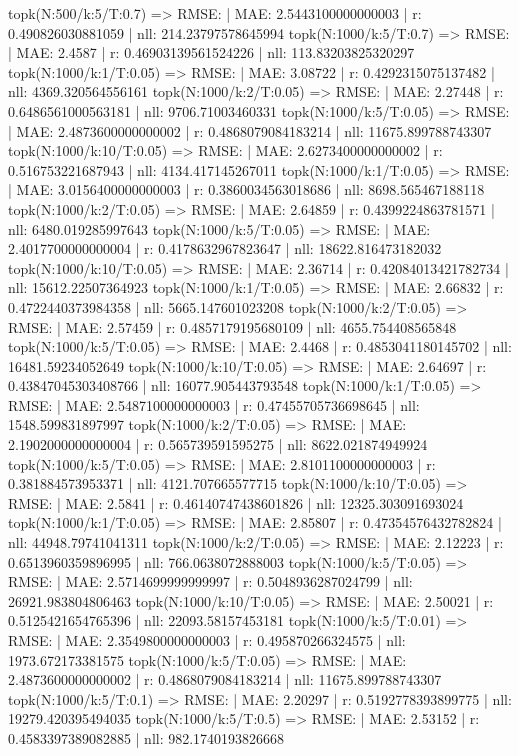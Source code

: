 topk(N:500/k:5/T:0.7) => RMSE: | MAE: 2.5443100000000003 | r: 0.490826030881059 | nll: 214.23797578645994
topk(N:1000/k:5/T:0.7) => RMSE: | MAE: 2.4587 | r: 0.46903139561524226 | nll: 113.83203825320297
topk(N:1000/k:1/T:0.05) => RMSE: | MAE: 3.08722 | r: 0.4292315075137482 | nll: 4369.320564556161
topk(N:1000/k:2/T:0.05) => RMSE: | MAE: 2.27448 | r: 0.6486561000563181 | nll: 9706.71003460331
topk(N:1000/k:5/T:0.05) => RMSE: | MAE: 2.4873600000000002 | r: 0.4868079084183214 | nll: 11675.899788743307
topk(N:1000/k:10/T:0.05) => RMSE: | MAE: 2.6273400000000002 | r: 0.516753221687943 | nll: 4134.417145267011
topk(N:1000/k:1/T:0.05) => RMSE: | MAE: 3.0156400000000003 | r: 0.3860034563018686 | nll: 8698.565467188118
topk(N:1000/k:2/T:0.05) => RMSE: | MAE: 2.64859 | r: 0.4399224863781571 | nll: 6480.019285997643
topk(N:1000/k:5/T:0.05) => RMSE: | MAE: 2.4017700000000004 | r: 0.4178632967823647 | nll: 18622.816473182032
topk(N:1000/k:10/T:0.05) => RMSE: | MAE: 2.36714 | r: 0.42084013421782734 | nll: 15612.22507364923
topk(N:1000/k:1/T:0.05) => RMSE: | MAE: 2.66832 | r: 0.4722440373984358 | nll: 5665.147601023208
topk(N:1000/k:2/T:0.05) => RMSE: | MAE: 2.57459 | r: 0.4857179195680109 | nll: 4655.754408565848
topk(N:1000/k:5/T:0.05) => RMSE: | MAE: 2.4468 | r: 0.4853041180145702 | nll: 16481.59234052649
topk(N:1000/k:10/T:0.05) => RMSE: | MAE: 2.64697 | r: 0.43847045303408766 | nll: 16077.905443793548
topk(N:1000/k:1/T:0.05) => RMSE: | MAE: 2.5487100000000003 | r: 0.47455705736698645 | nll: 1548.599831897997
topk(N:1000/k:2/T:0.05) => RMSE: | MAE: 2.1902000000000004 | r: 0.565739591595275 | nll: 8622.021874949924
topk(N:1000/k:5/T:0.05) => RMSE: | MAE: 2.8101100000000003 | r: 0.381884573953371 | nll: 4121.707665577715
topk(N:1000/k:10/T:0.05) => RMSE: | MAE: 2.5841 | r: 0.46140747438601826 | nll: 12325.303091693024
topk(N:1000/k:1/T:0.05) => RMSE: | MAE: 2.85807 | r: 0.47354576432782824 | nll: 44948.79741041311
topk(N:1000/k:2/T:0.05) => RMSE: | MAE: 2.12223 | r: 0.6513960359896995 | nll: 766.0638072888003
topk(N:1000/k:5/T:0.05) => RMSE: | MAE: 2.5714699999999997 | r: 0.5048936287024799 | nll: 26921.983804806463
topk(N:1000/k:10/T:0.05) => RMSE: | MAE: 2.50021 | r: 0.5125421654765396 | nll: 22093.58157453181
topk(N:1000/k:5/T:0.01) => RMSE: | MAE: 2.3549800000000003 | r: 0.495870266324575 | nll: 1973.672173381575
topk(N:1000/k:5/T:0.05) => RMSE: | MAE: 2.4873600000000002 | r: 0.4868079084183214 | nll: 11675.899788743307
topk(N:1000/k:5/T:0.1) => RMSE: | MAE: 2.20297 | r: 0.5192778393899775 | nll: 19279.420395494035
topk(N:1000/k:5/T:0.5) => RMSE: | MAE: 2.53152 | r: 0.4583397389082885 | nll: 982.1740193826668
